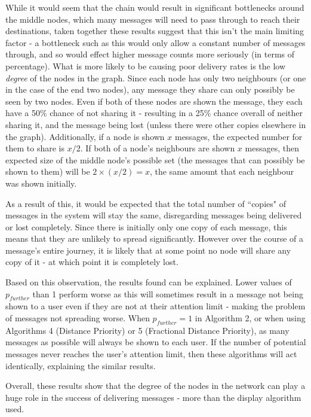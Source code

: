 \documentclass[bsc,frontabs,twoside,singlespacing,parskip,deptreport]{infthesis}     %
\begin{document}
While it would seem that the chain would result in significant bottlenecks around the middle nodes, which many messages will need to pass through to reach their destinations, taken together these results suggest that this isn't the main limiting factor - a bottleneck such as this would only allow a constant number of messages through, and so would effect higher message counts more seriously (in terms of percentage). What is more likely to be causing poor delivery rates is the low \textit{degree} of the nodes in the graph. Since each node has only two neighbours (or one in the case of the end two nodes), any message they share can only possibly be seen by two nodes. Even if both of these nodes are shown the message, they each have a 50\% chance of not sharing it - resulting in a 25\% chance overall of neither sharing it, and the message being lost (unless there were other copies elsewhere in the graph). Additionally, if a node is shown $x$ messages, the expected number for them to share is $x/2$. If both of a node's neighbours are shown $x$ messages, then expected size of the middle node's possible set (the messages that can possibly be shown to them) will be $2 \times (x/2) = x$, the same amount that each neighbour was shown initially.

As a result of this, it would be expected that the total number of ``copies" of messages in the system will stay the same, disregarding messages being delivered or lost completely. Since there is initially only one copy of each message, this means that they are unlikely to spread significantly. However over the course of a message's entire journey, it is likely that at some point no node will share any copy of it - at which point it is completely lost.

Based on this observation, the results found can be explained. Lower values of $p_{further}$ than 1 perform worse as this will sometimes result in a message not being shown to a user even if they are not at their attention limit - making the problem of messages not spreading worse. When $p_{further}=1$ in Algorithm 2, or when using Algorithms 4 (Distance Priority) or 5 (Fractional Distance Priority), as many messages as possible will always be shown to each user. If the number of potential messages never reaches the user's attention limit, then these algorithms will act identically, explaining the similar results.

Overall, these results show that the degree of the nodes in the network can play a huge role in the success of delivering messages - more than the display algorithm used.
\end{document}
